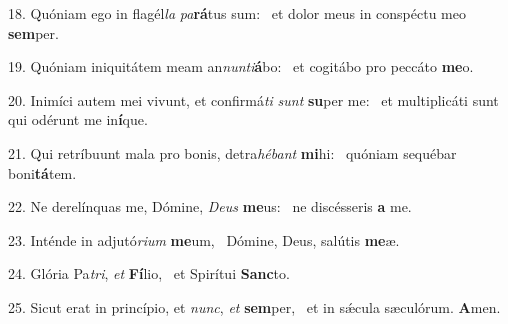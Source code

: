 18. Quóniam ego in flagél\textit{la} \textit{pa}\textbf{rá}tus sum: \ast\  et dolor meus in conspéctu meo \textbf{sem}per.\

19. Quóniam iniquitátem meam an\textit{nun}\textit{ti}\textbf{á}bo: \ast\  et cogitábo pro peccáto \textbf{me}o.\

20. Inimíci autem mei vivunt, et confirmá\textit{ti} \textit{sunt} \textbf{su}per me: \ast\  et multiplicáti sunt qui odérunt me in\textbf{í}que.\

21. Qui retríbuunt mala pro bonis, detra\textit{hé}\textit{bant} \textbf{mi}hi: \ast\  quóniam sequébar boni\textbf{tá}tem.\

22. Ne derelínquas me, Dómine, \textit{De}\textit{us} \textbf{me}us: \ast\  ne discésseris \textbf{a} me.\

23. Inténde in adjutó\textit{ri}\textit{um} \textbf{me}um, \ast\  Dómine, Deus, salútis \textbf{me}æ.\

24. Glória Pa\textit{tri}, \textit{et} \textbf{Fí}lio, \ast\  et Spirítui \textbf{Sanc}to.\

25. Sicut erat in princípio, et \textit{nunc}, \textit{et} \textbf{sem}per, \ast\  et in sǽcula sæculórum. \textbf{A}men.\

